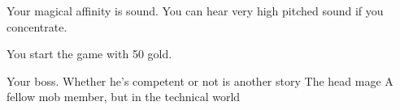 \documentclass[char]{guildcamp3}
\begin{document}
\begin{itemz}[Notes]
	\item Your magical affinity is sound. You can hear very high pitched sound if you concentrate.
	\item You start the game with 50 gold. 
\end{itemz}

\begin{contacts}
  \contact{\cNobleOne{}} Your boss. Whether he's competent or not is another story
  \contact{\cMageOne{}} The head mage
  \contact{\cSciOne{}} A fellow mob member, but in the technical world
\end{contacts}
\end{document}
